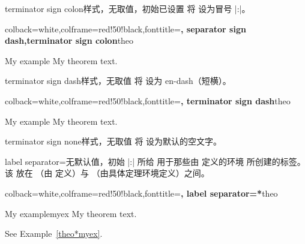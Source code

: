 \clearpage
\begin{docTcbKey}{terminator sign colon}{}{样式，无取值，初始已设置}
将  设为冒号 |:|。
\begin{dispExample}
%
  {colback=white,colframe=red!50!black,fonttitle=\bfseries,
   separator sign dash,terminator sign colon}{theo}
\begin{sometheorem}{My example}{}
My theorem text.
\end{sometheorem}
\end{dispExample}
\end{docTcbKey}

\begin{docTcbKey}{terminator sign dash}{}{样式，无取值}
将  设为 en-dash（短横）。
\begin{dispExample}
%
  {colback=white,colframe=red!50!black,fonttitle=\bfseries,
   terminator sign dash}{theo}
\begin{sometheorem}{My example}{}
My theorem text.
\end{sometheorem}
\end{dispExample}
\end{docTcbKey}

\begin{docTcbKey}{terminator sign none}{}{样式，无取值}
将  设为默认的空文字。
\end{docTcbKey}


\begin{docTcbKey}[][doc new=2016-04-19]{label separator}{=}{无默认值，初始 |:|}
  所给  用于那些由  定义的环境
  所创建的标签。该  放在 
  （由  定义）与 
  （由具体定理环境定义）之间。
\begin{dispExample}
%
  {colback=white,colframe=red!50!black,fonttitle=\bfseries,
   label separator=*}{theo}
\begin{sometheorem}{My example}{myex}
My theorem text.
\end{sometheorem}
See Example~\ref{theo*myex}.
\end{dispExample}
\end{docTcbKey}


\clearpage

